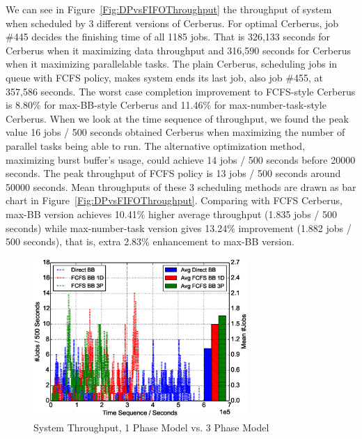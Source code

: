 We can see in Figure~\ref{Fig:DPvsFIFOThroughput} the throughput of system
when scheduled by 3 different versions of Cerberus.
For optimal Cerberus, job \#445 decides the finishing time of all 1185 jobs.
That is 326,133 seconds for Cerberus when it maximizing data throughput
and 316,590 seconds for Cerberus when it maximizing parallelable tasks.
The plain Cerberus, scheduling jobs in queue with FCFS policy,
makes system ends its last job, also job \#455, at 357,586 seconds.
The worst case completion improvement to FCFS-style Cerberus is
8.80\% for max-BB-style Cerberus and 11.46\% for max-number-task-style Cerberus.
When we look at the time sequence of throughput,
we found the peak value 16 jobs / 500 seconds obtained Cerberus
when maximizing the number of parallel tasks being able to run.
The alternative optimization method, maximizing burst buffer's usage,
could achieve 14 jobs / 500 seconds before 20000 seconds.
The peak throughput of FCFS policy is 13 jobs / 500 seconds around 50000 seconds.
Mean throughputs of these 3 scheduling methods are drawn
as bar chart in Figure~\ref{Fig:DPvsFIFOThroughput}.
Comparing with FCFS Cerberus, max-BB version achieves
10.41\% higher average throughput (1.835 jobs / 500 seconds)
while max-number-task version gives 13.24\% improvement (1.882 jobs / 500 seconds),
that is, extra 2.83\% enhancement to max-BB version.

\begin{figure}[!t]
        \centering
        \includegraphics[width=3.2in]{Draw3Pvs1P/1000jobs_3p_vs_1p_throughput}
        \caption{System Throughput, 1 Phase Model vs. 3 Phase Model}
        \label{Fig:3Pvs1PThroughput}
\end{figure}


